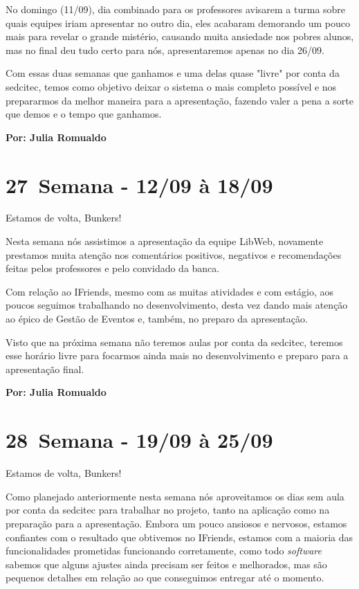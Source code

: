 No domingo (11/09), dia combinado para os professores avisarem a turma sobre quais equipes iriam apresentar no outro dia, eles acabaram demorando um pouco mais para revelar o grande mistério, causando muita ansiedade nos pobres alunos, mas no final deu tudo certo para nós, apresentaremos apenas no dia 26/09. 

Com essas duas semanas que ganhamos e uma delas quase "livre" por conta da \acs{sedcitec}, temos como objetivo deixar o sistema o mais completo possível e nos prepararmos da melhor maneira para a apresentação, fazendo valer a pena a sorte que demos e o tempo que ganhamos. 

\textbf{Por: Julia Romualdo}

\section{27\textordfeminine \, Semana - 12/09 à 18/09}
Estamos de volta, Bunkers!

Nesta semana nós assistimos a apresentação da equipe LibWeb, novamente prestamos muita atenção nos comentários positivos, negativos e recomendações feitas pelos professores e pelo convidado da banca. 

Com relação ao IFriends, mesmo com as muitas atividades e com estágio, aos poucos seguimos trabalhando no desenvolvimento, desta vez dando mais atenção ao épico de Gestão de Eventos e, também, no preparo da apresentação. 

Visto que na próxima semana não teremos aulas por conta da \acs{sedcitec}, teremos esse horário livre para focarmos ainda mais no desenvolvimento e preparo para a apresentação final.

\textbf{Por: Julia Romualdo}

\section{28\textordfeminine \, Semana - 19/09 à 25/09}
Estamos de volta, Bunkers!

Como planejado anteriormente nesta semana nós  aproveitamos os dias sem aula por conta da \acs{sedcitec} para trabalhar no projeto, tanto na aplicação como na preparação para a apresentação. Embora um pouco ansiosos e nervosos, estamos confiantes com o resultado que obtivemos no IFriends, estamos com a maioria das funcionalidades prometidas funcionando corretamente, como todo \textit{software} sabemos que alguns ajustes ainda precisam ser feitos e melhorados, mas são pequenos detalhes em relação ao que conseguimos entregar até o momento. 

